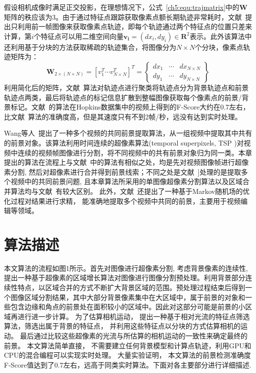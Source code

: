 假设相机成像时满足正交投影，在理想情况下，公式~\ref{ch5:equ:trajmatrix}中的$\mathbf{W}$矩阵的秩应该为3\cite{Tomasi_1992}。由于通过特征点跟踪获取像素点额长期轨迹非常耗时，文献~\cite{ACPRRealTime}提出只利用前一帧图像来获取像素点轨迹，即每个轨迹通过两个特征点的位置只差来计算，第$i$个特征点可以用二维空间向量$\mathbf{v_i}=(dx_i,dy_i) \in \mathbf{R}^2$表示。此外该算法中还利用基于分块的方法获取稀疏的轨迹集合，将图像分为$N \times N$个分块，像素点轨迹矩阵为：
$$ \mathbf{W}_{2 \times (N \times N )} = {[v_{1}^T \cdots v_{N \times N}^T]}^T = \begin{Bmatrix}
dx_1 & \cdots & dx_{N \times N} \\
dy_1 & \cdots & dy_{N \times N}
\end{Bmatrix}$$
利用简化后的矩阵，文献~\cite{ACPRRealTime}算法对轨迹点进行聚类将轨迹点分为背景轨迹点和前景轨迹点两类，最后将轨迹点的标记信息扩散到整幅图像获取每个像素点的前景/背景标记。文献~\cite{ACPRRealTime}的算法在Hopkins数据集中的视频上\cite{HopKinsDataSet}得到的F-Score大约在0.7左右，比文献~\cite{5.8s}算法的准确度高，但是其速度只有不到2帧/秒，远没有达到实时处理。\par

Wang等人~\cite{WangTMM2014}提出了一种多个视频的共同前景提取算法，从一组视频中提取其中共有的前景对象。该算法利用时间连续的超像素算法(temporal superpixels, TSP )对视频中连续的视频帧图像进行分割，将不同视频中的共有前景对象归为同一类。本章提出的算法在流程上与文献~中的算法有相似之处，均是先对视频图像帧进行超像素分割, 然后对超像素进行合并得到前景线索；不同之处是文献~]处理的是提取多个视频中的共同前景问题, 且本章算法所采用的单图像超像素分割算法以及区域合并算法均与文献~有较大区别。 此外，文献~还提出了一种基于Markov随机场的优化过程对结果进行求精， 能准确地提取多个视频中共同的前景，主要用于视频编辑等领域。




\section{算法描述}
\label{ch5:sec:algorithm}
本文算法的流程如图1所示。首先对图像进行超像素分割, 考虑背景像素的连续性, 提出一种基于超像素的区域增长算法对图像进行图像分割预处理。利用背景部分连续性特点，以区域合并的方式不断扩大背景区域的范围。预处理过程结束后得到一个图像区域分割结果，其中大部分背景像素集中在大区域中，属于前景的对象和一些包含边缘和角点的前景处在面积较小的区域中。因此对这部分可能是前景的小区域再进行进一步计算。 为了估算相机运动， 提出一种基于相对光流的特征点筛选算法，筛选出属于背景的特征点， 并利用这些特征点以分块的方式估算相机的运动。 最后通过比较这些超像素的光流与所估算的相机运动的一致性来确定最终的前景。 本文算法简单直接， 不需要建立任何背景模型和计算点轨迹，利用GPU和CPU的混合编程可以实现实时处理。 大量实验证明， 本文算法的前景检测准确度F-Score值达到了0.7左右，远高于同类实时算法\cite{5.8s}。下面对各主要部分进行详细描述.
